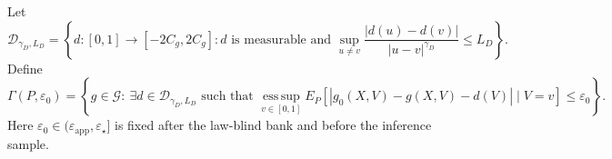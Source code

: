 Let
\[
 \mathcal D_{\gamma_D,L_D}
 =\left\{d:[0,1]\to[-2C_g,2C_g]:d\text{ is measurable and }
 \sup_{u\ne v}\frac{|d(u)-d(v)|}{|u-v|^{\gamma_D}}\le L_D\right\}.
\]
Define
\[
 \Gamma(P,\varepsilon_0)
 =\left\{g\in\mathcal G:\ \exists d\in\mathcal D_{\gamma_D,L_D}\text{ such that }
 \operatorname*{ess\,sup}_{v\in[0,1]}
 E_P[|g_0(X,V)-g(X,V)-d(V)|\mid V=v]
 \le\varepsilon_0\right\}.
\]
Here \(\varepsilon_0\in(\varepsilon_{\mathrm{app}},\varepsilon_\star]\) is fixed after the law-blind bank and before the inference sample.